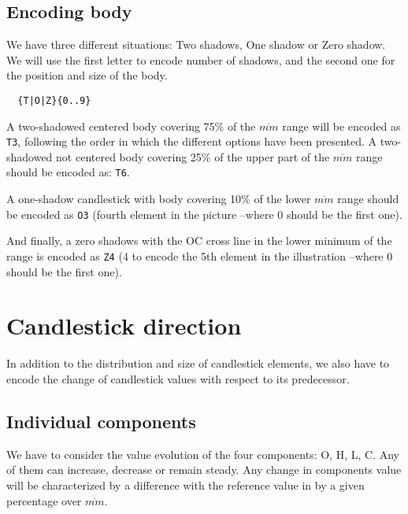\documentclass[]{article}
\begin{document}
\subsection{Encoding body}

We have three different situations: Two shadows, One shadow or Zero shadow. We will use the first letter to encode number of shadows, and the second one for the position and size of the body.

\begin{verbatim}
  {T|O|Z}{0..9}
\end{verbatim}

A two-shadowed centered body covering 75\% of the $\overline{mm}$ range will be encoded as \texttt{T3}, following the order in which the different options have been presented. A two-shadowed not centered body covering 25\% of the upper part of the $\overline{mm}$ range should be encoded as: \texttt{T6}.

A one-shadow candlestick with body covering 10\% of the lower $\overline{mm}$ range should be encoded as \texttt{O3} (fourth element in the picture --where 0 should be the first one).

And finally, a zero shadows with the OC cross line in the lower minimum of the range is encoded as \texttt{Z4} (4 to encode the 5th element in the illustration --where 0 should be the first one).

\section{Candlestick direction}

In addition to the distribution and size of candlestick elements, we also have to encode the change of candlestick values with respect to its predecessor.

\subsection{Individual components}

We have to consider the value evolution of the four components: O, H, L, C. Any of them can increase, decrease or remain steady. Any change in components value will be characterized by a difference with the reference value in by a given percentage over $\overline{mm}$.
\end{document}
